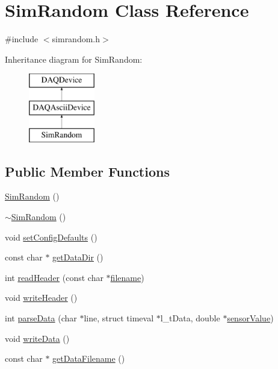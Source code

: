 \hypertarget{classSimRandom}{\section{Sim\-Random Class Reference}
\label{classSimRandom}
}


{\ttfamily \#include $<$simrandom.\-h$>$}

Inheritance diagram for Sim\-Random\-:\begin{figure}[H]
\begin{center}
\leavevmode
\includegraphics[height=3.000000cm]{classSimRandom}
\end{center}
\end{figure}
\subsection*{Public Member Functions}
\begin{DoxyCompactItemize}
\item 
\hyperlink{classSimRandom_a734a95f856d89911c75d83e464fa2579}{Sim\-Random} ()
\item 
\hyperlink{classSimRandom_ae5a11688acf03196c76b5b6774bc2a75}{$\sim$\-Sim\-Random} ()
\item 
void \hyperlink{classSimRandom_a48019bace7da9b182ef482e135b6736e}{set\-Config\-Defaults} ()
\item 
const char $\ast$ \hyperlink{classSimRandom_a5d4693d599a13efe8a75cf72dd55d8f3}{get\-Data\-Dir} ()
\item 
int \hyperlink{classSimRandom_a2a652b85ec23f610491f5f838664f152}{read\-Header} (const char $\ast$\hyperlink{classDAQDevice_a7f9cda7cf5b41f6b134c313477e9644b}{filename})
\item 
void \hyperlink{classSimRandom_a5119c39c479a46a691fe63b3b388c3fc}{write\-Header} ()
\item 
int \hyperlink{classSimRandom_a239bacabadccabc3c6d32278ab357ac1}{parse\-Data} (char $\ast$line, struct timeval $\ast$l\-\_\-t\-Data, double $\ast$\hyperlink{classDAQDevice_ad148188c57598fdf4fd4c1c333aeb0d8}{sensor\-Value})
\item 
void \hyperlink{classSimRandom_a8ef2df7e35047cee952340901a96aba4}{write\-Data} ()
\item 
const char $\ast$ \hyperlink{classSimRandom_ae456d364f9f6eda82fa7947cb3ccd813}{get\-Data\-Filename} ()
\end{DoxyCompactItemize}
